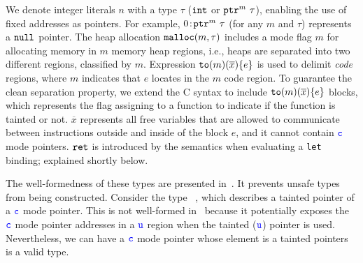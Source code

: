 We denote integer literals $n$ with a type $\tau$ (\ie $\mathtt{int}$ or $\mathtt{ptr}^{m}~{\tau}$), enabling the use of fixed addresses as pointers.
For example, ${0}\!:\!{\mathtt{ptr}^{m}~{\tau}}$ (for any $m$ and $\tau$) represents a $\mathtt{null}$ pointer.
The heap allocation $\mathtt{malloc}({m},{\tau})$ includes a mode flag $m$ for allocating memory in $m$ memory heap regions, i.e., heaps are separated into two different regions, classified by $m$.
Expression $\mathtt{to}({m})(\overline{x})\{e\}$ is used to delimit \textit{code} regions, where $m$ indicates that $e$ locates in the $m$ code region.
To guarantee the clean separation property, we extend the C syntax to include $\mathtt{to}({m})(\overline{x})\{e\}$ blocks,
which represents the flag assigning to a function to indicate if the function is tainted or not.
$\overline{x}$ represents all free variables that are allowed to communicate between instructions outside and inside of the block $e$, and it cannot contain $\textcolor{blue}{\texttt{c}}$ mode pointers.
$\mathtt{ret}$ is introduced by the semantics when evaluating a \texttt{let} binding; explained shortly below.


The well-formedness of these types are presented in~.
It prevents unsafe types from being constructed.
  Consider the type ~, which describes a tainted pointer of a $\textcolor{blue}{\texttt{c}}$ mode pointer.
  This is not well-formed in~\lang{} because it potentially exposes the $\textcolor{blue}{\texttt{c}}$ mode pointer addresses in a $\textcolor{blue}{\texttt{u}}$ region when the tainted ($\textcolor{blue}{\texttt{u}}$) pointer is used. 
  Nevertheless, we can have a $\textcolor{blue}{\texttt{c}}$ mode pointer whose element is a tainted pointers\mzs{,}\mzr{:}~\eg~ is a valid type.

